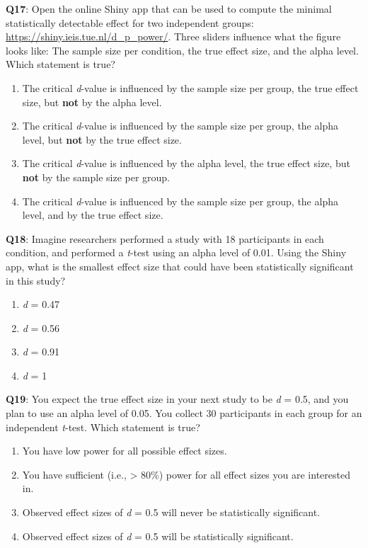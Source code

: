 \documentclass[
  oneside]{book}
\providecommand{\tightlist}{%
  \setlength{\itemsep}{0pt}\setlength{\parskip}{0pt}}
\begin{document}
\textbf{Q17}: Open the online Shiny app that can be used to compute the minimal statistically detectable effect for two independent groups: \url{https://shiny.ieis.tue.nl/d_p_power/}. Three sliders influence what the figure looks like: The sample size per condition, the true effect size, and the alpha level. Which statement is true?

\begin{enumerate}
\def\labelenumi{\Alph{enumi})}
\tightlist
\item
  The critical \emph{d}-value is influenced by the sample size per group, the true effect size, but \textbf{not} by the alpha level.
\item
  The critical \emph{d}-value is influenced by the sample size per group, the alpha level, but \textbf{not} by the true effect size.
\item
  The critical \emph{d}-value is influenced by the alpha level, the true effect size, but \textbf{not} by the sample size per group.
\item
  The critical \emph{d}-value is influenced by the sample size per group, the alpha level, and by the true effect size.
\end{enumerate}

\textbf{Q18}: Imagine researchers performed a study with 18 participants in each condition, and performed a \emph{t}-test using an alpha level of 0.01. Using the Shiny app, what is the smallest effect size that could have been statistically significant in this study?

\begin{enumerate}
\def\labelenumi{\Alph{enumi})}
\tightlist
\item
  \emph{d} = 0.47
\item
  \emph{d} = 0.56
\item
  \emph{d} = 0.91
\item
  \emph{d} = 1
\end{enumerate}

\textbf{Q19}: You expect the true effect size in your next study to be \emph{d} = 0.5, and you plan to use an alpha level of 0.05. You collect 30 participants in each group for an independent \emph{t}-test. Which statement is true?

\begin{enumerate}
\def\labelenumi{\Alph{enumi})}
\tightlist
\item
  You have low power for all possible effect sizes.
\item
  You have sufficient (i.e., \textgreater{} 80\%) power for all effect sizes you are interested in.
\item
  Observed effect sizes of \emph{d} = 0.5 will never be statistically significant.
\item
  Observed effect sizes of \emph{d} = 0.5 will be statistically significant.
\end{enumerate}
\end{document}
